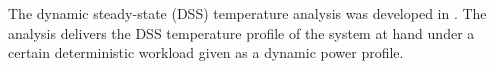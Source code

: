 The dynamic steady-state (DSS) temperature analysis was developed in \cite{ukhov2012}.
The analysis delivers the DSS temperature profile of the system at hand under a certain deterministic workload given as a dynamic power profile.
